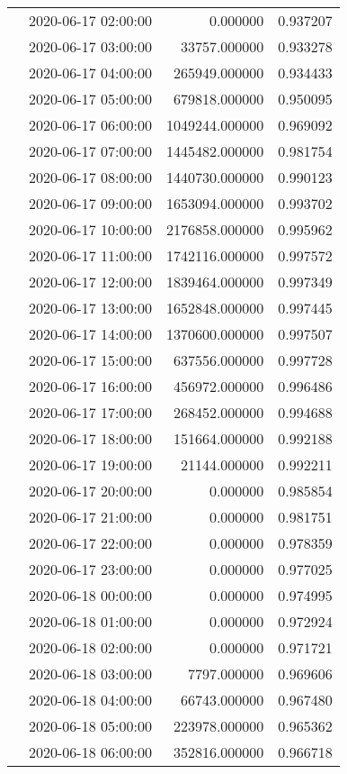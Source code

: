 \begin{tabular}{llrr}
 & 2020-06-17 02:00:00 & 0.000000 & 0.937207 \\
 & 2020-06-17 03:00:00 & 33757.000000 & 0.933278 \\
 & 2020-06-17 04:00:00 & 265949.000000 & 0.934433 \\
 & 2020-06-17 05:00:00 & 679818.000000 & 0.950095 \\
 & 2020-06-17 06:00:00 & 1049244.000000 & 0.969092 \\
 & 2020-06-17 07:00:00 & 1445482.000000 & 0.981754 \\
 & 2020-06-17 08:00:00 & 1440730.000000 & 0.990123 \\
 & 2020-06-17 09:00:00 & 1653094.000000 & 0.993702 \\
 & 2020-06-17 10:00:00 & 2176858.000000 & 0.995962 \\
 & 2020-06-17 11:00:00 & 1742116.000000 & 0.997572 \\
 & 2020-06-17 12:00:00 & 1839464.000000 & 0.997349 \\
 & 2020-06-17 13:00:00 & 1652848.000000 & 0.997445 \\
 & 2020-06-17 14:00:00 & 1370600.000000 & 0.997507 \\
 & 2020-06-17 15:00:00 & 637556.000000 & 0.997728 \\
 & 2020-06-17 16:00:00 & 456972.000000 & 0.996486 \\
 & 2020-06-17 17:00:00 & 268452.000000 & 0.994688 \\
 & 2020-06-17 18:00:00 & 151664.000000 & 0.992188 \\
 & 2020-06-17 19:00:00 & 21144.000000 & 0.992211 \\
 & 2020-06-17 20:00:00 & 0.000000 & 0.985854 \\
 & 2020-06-17 21:00:00 & 0.000000 & 0.981751 \\
 & 2020-06-17 22:00:00 & 0.000000 & 0.978359 \\
 & 2020-06-17 23:00:00 & 0.000000 & 0.977025 \\
 & 2020-06-18 00:00:00 & 0.000000 & 0.974995 \\
 & 2020-06-18 01:00:00 & 0.000000 & 0.972924 \\
 & 2020-06-18 02:00:00 & 0.000000 & 0.971721 \\
 & 2020-06-18 03:00:00 & 7797.000000 & 0.969606 \\
 & 2020-06-18 04:00:00 & 66743.000000 & 0.967480 \\
 & 2020-06-18 05:00:00 & 223978.000000 & 0.965362 \\
 & 2020-06-18 06:00:00 & 352816.000000 & 0.966718 \\

\end{tabular}
